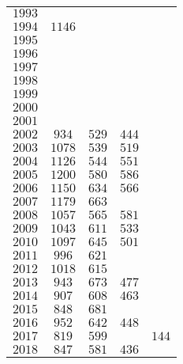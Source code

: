 \begin{longtable}{|l|cccc|}
    $1993$  &       &       &       &       \\
    $1994$  & $1146$&       &       &       \\
    $1995$  &       &       &       &       \\
    $1996$  &       &       &       &       \\
    $1997$  &       &       &       &       \\
    $1998$  &       &       &       &       \\
    $1999$  &       &       &       &       \\
    $2000$  &       &       &       &       \\
    $2001$  &       &       &       &       \\
    $2002$  & $934$ & $529$ & $444$ &       \\
    $2003$  & $1078$& $539$ & $519$ &       \\
    $2004$  & $1126$& $544$ & $551$ &       \\
    $2005$  & $1200$& $580$ & $586$ &       \\
    $2006$  & $1150$& $634$ & $566$ &       \\
    $2007$  & $1179$& $663$ &       &       \\
    $2008$  & $1057$& $565$ & $581$ &       \\
    $2009$  & $1043$& $611$ & $533$ &       \\
    $2010$  & $1097$& $645$ & $501$ &       \\
    $2011$  & $996$ & $621$ &       &       \\
    $2012$  & $1018$& $615$ &       &       \\
    $2013$  & $943$ & $673$ & $477$ &       \\
    $2014$  & $907$ & $608$ & $463$ &       \\
    $2015$  & $848$ & $681$ &       &       \\
    $2016$  & $952$ & $642$ & $448$ &       \\
    $2017$  & $819$ & $599$ &       & $144$ \\
    $2018$  & $847$ & $581$ & $436$ &       \\
\hline
\end{longtable}


